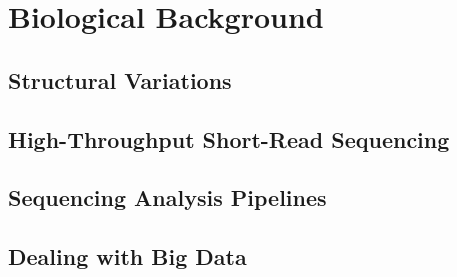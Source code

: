 \chapter{Biological Background}\label{chap_background}

\section{Structural Variations}

\section{High-Throughput Short-Read Sequencing}

\section{Sequencing Analysis Pipelines}\label{section_pipelines}

\section{Dealing with Big Data}
